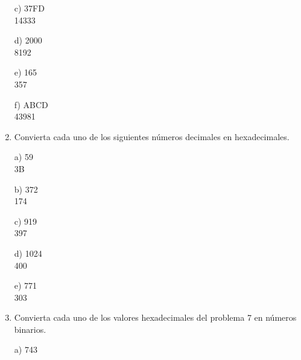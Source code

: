 \documentclass[a4paper, 12pt]{article}
\newcommand{\Aspace}{0.2cm}
\begin{document}
\begin{enumerate}
            \vspace{\Aspace} \par
            c) 37FD
            \\ { \color{azul} 14333 }

            \vspace{\Aspace} \par
            d) 2000
            \\ { \color{azul} 8192 }

            \vspace{\Aspace} \par
            e) 165
            \\ { \color{azul} 357 }

            \vspace{\Aspace} \par
            f) ABCD
            \\ { \color{azul} 43981 }


        \item Convierta cada uno de los siguientes números decimales en hexadecimales.
            \vspace{\Aspace} \par
            a) 59
            \\ { \color{azul} 3B }

            \vspace{\Aspace} \par
            b) 372
            \\ { \color{azul} 174 }

            \vspace{\Aspace} \par
            c) 919
            \\ { \color{azul} 397 }

            \vspace{\Aspace} \par
            d) 1024
            \\ { \color{azul} 400 }

            \vspace{\Aspace} \par
            e) 771
            \\ { \color{azul} 303 }


        \item Convierta cada uno de los valores hexadecimales del problema 7 en números binarios.
            \vspace{\Aspace} \par
            a) 743
            \\ { \color{azul}  }


\end{enumerate}
\end{document}
